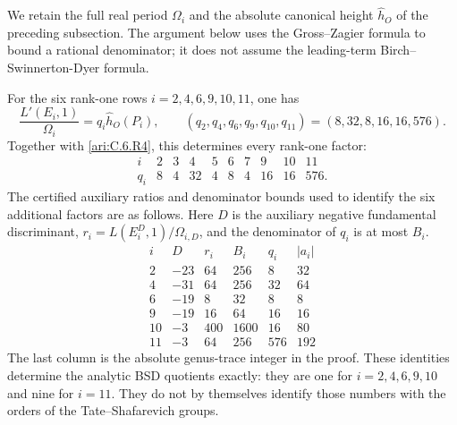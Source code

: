 We retain the full real period $\Omega_i$ and the absolute canonical
height $\widehat h_O$ of the preceding subsection. The argument below
uses the Gross--Zagier formula to bound a rational denominator; it does
not assume the leading-term Birch--Swinnerton-Dyer formula.

\begin{proposition}\hypertarget{tag-0014}{}\label{ari:C.6.R5}

For the six rank-one rows $i=2,4,6,9,10,11$, one has
\[
 \frac{L'(E_i,1)}{\Omega_i}
   =q_i\widehat h_O(P_i),\qquad
 (q_2,q_4,q_6,q_9,q_{10},q_{11})=(8,32,8,16,16,576).
\]
Together with \ref{ari:C.6.R4}, this determines every rank-one factor:
\[
\begin{array}{c|rrrrrrrrr}
 i&2&3&4&5&6&7&9&10&11\\\hline
 q_i&8&4&32&4&8&4&16&16&576.
\end{array}
\]
The certified auxiliary ratios and denominator bounds used to identify
the six additional factors are as follows. Here $D$ is the auxiliary
negative fundamental discriminant,
$r_i=L(E_i^D,1)/\Omega_{i,D}$, and the denominator of $q_i$ is at most
$B_i$.
\[
\begin{array}{c|r|r|r|r|r}
 i&D&r_i&B_i&q_i&|a_i|\\\hline
 2&-23&64&256&8&32\\
 4&-31&64&256&32&64\\
 6&-19&8&32&8&8\\
 9&-19&16&64&16&16\\
 10&-3&400&1600&16&80\\
 11&-3&64&256&576&192
\end{array}
\]
The last column is the absolute genus-trace integer in the proof. These
identities determine the analytic BSD quotients exactly: they are one
for $i=2,4,6,9,10$ and nine for $i=11$. They do not by themselves
identify those numbers with the orders of the Tate--Shafarevich groups.
\end{proposition}



